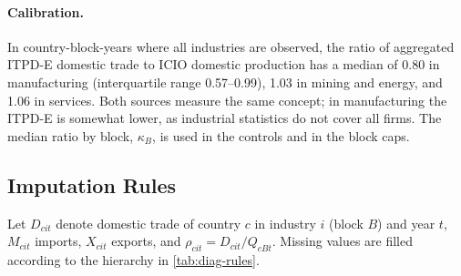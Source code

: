 \documentclass[final,1p,times,authoryear]{elsarticle}
\begin{document}
\paragraph{Calibration.} In country-block-years where all industries are observed, the ratio of aggregated ITPD-E domestic trade to ICIO domestic production has a median of 0.80 in manufacturing (interquartile range 0.57--0.99), 1.03 in mining and energy, and 1.06 in services. Both sources measure the same concept; in manufacturing the ITPD-E is somewhat lower, as industrial statistics do not cover all firms. The median ratio by block, $\kappa_B$, is used in the controls and in the block caps.

\subsection{Imputation Rules}
Let $D_{cit}$ denote domestic trade of country $c$ in industry $i$ (block $B$) and year $t$, $M_{cit}$ imports, $X_{cit}$ exports, and $\rho_{cit} = D_{cit}/Q_{cBt}$. Missing values are filled according to the hierarchy in \cref{tab:diag-rules}.
\end{document}
